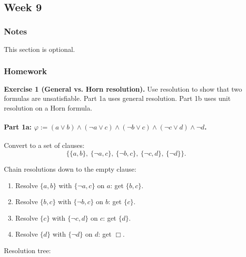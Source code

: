 \documentclass{article}
\theoremstyle{theorem}
\theoremstyle{definition}
\theoremstyle{remark}
\begin{document}
\subsection{Week 9}

\subsubsection{Notes}

This section is optional. 

\subsubsection{Homework}

\textbf{Exercise 1 (General vs. Horn resolution).}
Use resolution to show that two formulas are unsatisfiable. Part 1a uses general resolution. Part 1b uses unit resolution on a Horn formula.

\paragraph{Part 1a: $\varphi := (a \lor b) \land (\lnot a \lor c) \land (\lnot b \lor c) \land (\lnot c \lor d) \land \lnot d$.}

Convert to a set of clauses:
\[
  \{\{a, b\},\ \{\lnot a, c\},\ \{\lnot b, c\},\ \{\lnot c, d\},\ \{\lnot d\}\}.
\]

Chain resolutions down to the empty clause:
\begin{enumerate}
  \item Resolve $\{a, b\}$ with $\{\lnot a, c\}$ on $a$: get $\{b, c\}$.
  \item Resolve $\{b, c\}$ with $\{\lnot b, c\}$ on $b$: get $\{c\}$.
  \item Resolve $\{c\}$ with $\{\lnot c, d\}$ on $c$: get $\{d\}$.
  \item Resolve $\{d\}$ with $\{\lnot d\}$ on $d$: get $\Box$.
\end{enumerate}

Resolution tree:

\begin{center}
\end{center}
\end{document}
